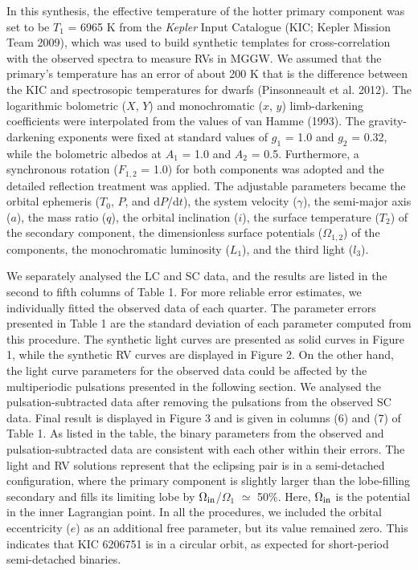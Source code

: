 \documentclass[useAMS,usenatbib,usegraphicx]{mn2e}
\begin{document}
In this synthesis, the effective temperature of the hotter primary component was set to be $T_1$ = 6965 K from 
the {\it Kepler} Input Catalogue (KIC; Kepler Mission Team 2009), which was used to build synthetic templates for 
cross-correlation with the observed spectra to measure RVs in MGGW. We assumed that the primary's temperature has an error 
of about 200 K that is the difference between the KIC and spectrosopic temperatures for dwarfs (Pinsonneault et al. 2012). 
The logarithmic bolometric ($X$, $Y$) and monochromatic ($x$, $y$) limb-darkening coefficients were interpolated from 
the values of van Hamme (1993). The gravity-darkening exponents were fixed at standard values of $g_1$ = 1.0 and $g_2$ = 0.32, 
while the bolometric albedos at $A_1$ = 1.0 and $A_2$ = 0.5. Furthermore, a synchronous rotation ($F_{1,2}$ = 1.0) 
for both components was adopted and the detailed reflection treatment was applied. The adjustable parameters became 
the orbital ephemeris ($T_0$, $P$, and d$P$/d$t$), the system velocity ($\gamma$), the semi-major axis ($a$), the mass ratio 
($q$), the orbital inclination ($i$), the surface temperature ($T_2$) of the secondary component, the dimensionless surface 
potentials ($\Omega_{1,2}$) of the components, the monochromatic luminosity ($L_{1}$), and the third light ($l_3$).

We separately analysed the LC and SC data, and the results are listed in the second to fifth columns of Table 1. For more 
reliable error estimates, we individually fitted the observed data of each quarter. The parameter errors presented in 
Table 1 are the standard deviation of each parameter computed from this procedure. The synthetic light curves are presented 
as solid curves in Figure 1, while the synthetic RV curves are displayed in Figure 2. On the other hand, the light curve 
parameters for the observed data could be affected by the multiperiodic pulsations presented in the following section. 
We analysed the pulsation-subtracted data after removing the pulsations from the observed SC data. Final result is displayed 
in Figure 3 and is given in columns (6) and (7) of Table 1. As listed in the table, the binary parameters from the observed 
and pulsation-subtracted data are consistent with each other within their errors. The light and RV solutions represent that 
the eclipsing pair is in a semi-detached configuration, where the primary component is slightly larger than 
the lobe-filling secondary and fills its limiting lobe by $\Omega_{\rm in}$/$\Omega_1$ $\simeq$ 50\%. Here, $\Omega_{\rm in}$ 
is the potential in the inner Lagrangian point. In all the procedures, we included the orbital eccentricity ($e$) as 
an additional free parameter, but its value remained zero. This indicates that KIC 6206751 is in a circular orbit, as 
expected for short-period semi-detached binaries. 
\end{document}
